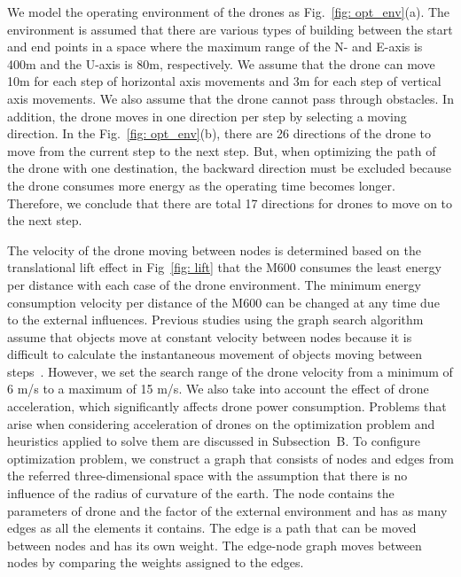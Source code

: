 \documentclass[journal]{./template/IEEEtran}
\begin{document}
We model the operating environment of the drones as Fig.~\ref{fig: opt_env}(a).
The environment is assumed that there are various types of building between the start and end points in a space where the maximum range of the N- and E-axis is 400m and the U-axis is 80m, respectively.
We assume that the drone can move 10m for each step of horizontal axis movements and 3m for each step of vertical axis movements. We also assume that the drone cannot pass through obstacles. In addition, the drone moves in one direction per step by selecting a moving direction.
In the Fig.~\ref{fig: opt_env}(b), there are 26 directions of the drone to move from the current step to the next step.
But, when optimizing the path of the drone with one destination, the backward direction must be excluded because the drone consumes more energy as the operating time becomes longer. Therefore, we conclude that there are total 17 directions for drones to move on to the next step.

The velocity of the drone moving between nodes is determined based on the translational lift effect in Fig~\ref{fig: lift} that the M600 consumes the least energy per distance with each case of the drone environment. 
The minimum energy consumption velocity per distance of the M600 can be changed at any time due to the external influences.  
Previous studies using the graph search algorithm assume that objects move at constant velocity between nodes because it is difficult to calculate the instantaneous movement of objects moving between steps~\cite{ref_8, ref_10, ref_22}. 
However, we set the search range of the drone velocity from a minimum of 6 m/s to a maximum of 15 m/s. We also take into account the effect of drone acceleration, which significantly affects drone power consumption.
Problems that arise when considering acceleration of drones on the optimization problem and heuristics applied to solve them are discussed in Subsection~B.
To configure optimization problem, we construct a graph that consists of nodes and edges from the referred three-dimensional space with the assumption that there is no influence of the radius of curvature of the earth.
The node contains the parameters of drone and the factor of the external environment and has as many edges as all the elements it contains. 
The edge is a path that can be moved between nodes and has its own weight. The edge-node graph moves between nodes by comparing the weights assigned to the edges.  
\end{document}
